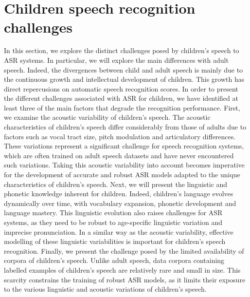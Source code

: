\section{Children speech  recognition challenges}%
\label{section:Children_seepch_challenges}
In this section, we explore the distinct challenges posed by children's speech to \ac{ASR} systems. In particular, we will explore the main differences with adult speech.  Indeed, the divergences between child and adult speech is mainly due to the continuous growth and intellectual development of children. This growth has direct repercusions on automatic speech recognition scores. In order to present the different challenges associated with \ac{ASR} for children, we have identified at least three of the main factors that degrade the recognition performance.
First, we examine the acoustic variability of children's speech. The acoustic characteristics of children's speech differ considerably from those of adults due to factors such as vocal tract size, pitch modulation and articulatory differences. These variations represent a significant challenge for speech recognition systems, which are often trained on adult speech datasets and have never encountered such variations. Taking this acoustic variability into account becomes imperative for the development of accurate and robust \ac{ASR} models adapted to the unique characteristics of children's speech.
Next, we will present the linguistic and phonetic knowledge inherent for children. Indeed, children's language evolves dynamically over time, with vocabulary expansion, phonetic development and language mastery. This linguistic evolution also raises challenges for \ac{ASR} systems, as they need to be robust to age-specific linguistic variation and imprecise pronunciation. In a similar way as the acoustic variability, effective modelling of these linguistic variabilities is important for children's speech recognition.
Finally, we present the challenge posed by the limited availability of corpora of children's speech. Unlike adult speech, data corpora containing labelled examples of children's speech are relatively rare and small in size. This scarcity constrains the training of robust \ac{ASR} models, as it limits their exposure to the various linguistic and acoustic variations of children's speech.

